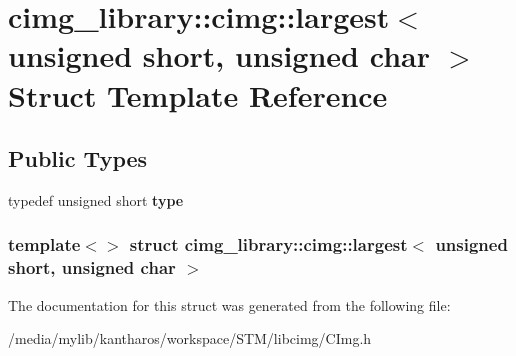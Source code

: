 \hypertarget{structcimg__library_1_1cimg_1_1largest_3_01unsigned_01short_00_01unsigned_01char_01_4}{
\section{cimg\_\-library::cimg::largest$<$ unsigned short, unsigned char $>$ Struct Template Reference}
\label{structcimg__library_1_1cimg_1_1largest_3_01unsigned_01short_00_01unsigned_01char_01_4}
}
\subsection*{Public Types}
\begin{DoxyCompactItemize}
\item 
\hypertarget{structcimg__library_1_1cimg_1_1largest_3_01unsigned_01short_00_01unsigned_01char_01_4_abf243a1b4507d5237cdb7ba1f921917d}{
typedef unsigned short {\bfseries type}}
\label{structcimg__library_1_1cimg_1_1largest_3_01unsigned_01short_00_01unsigned_01char_01_4_abf243a1b4507d5237cdb7ba1f921917d}

\end{DoxyCompactItemize}
\subsubsection*{template$<$$>$ struct cimg\_\-library::cimg::largest$<$ unsigned short, unsigned char $>$}



The documentation for this struct was generated from the following file:\begin{DoxyCompactItemize}
\item 
/media/mylib/kantharos/workspace/STM/libcimg/CImg.h\end{DoxyCompactItemize}
